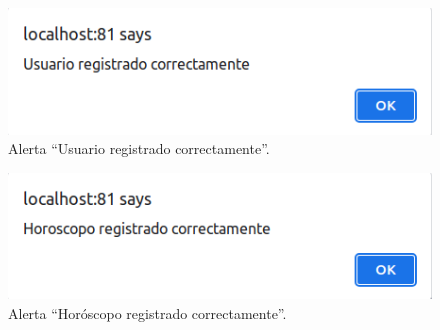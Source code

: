 \documentclass[12pt, twoside]{report}
\begin{document}
\begin{figure}[h]
\begin{center}
\includegraphics[scale=0.7]{images/actualización4.png}
\end{center}
\caption{\label{inicio} Alerta ``Usuario registrado correctamente''.}
\end{figure}
\begin{figure}[h]
\begin{center}
\includegraphics[scale=0.7]{images/actualización5.png}
\end{center}
\caption{\label{inicio} Alerta ``Horóscopo registrado correctamente''.}
\end{figure}
\end{document}
